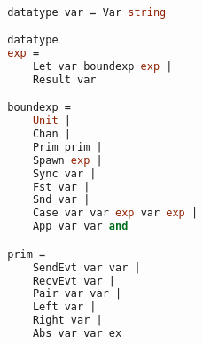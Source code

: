 \documentclass{article}
\begin{document}
    \begin{lstlisting}[language=ML, style=codestyle1]

        datatype var = Var string

        datatype
        exp = 
            Let var boundexp exp |
            Result var

        boundexp =
            Unit |
            Chan |
            Prim prim |
            Spawn exp |
            Sync var |
            Fst var |
            Snd var |
            Case var var exp var exp |
            App var var and

        prim = 
            SendEvt var var |
            RecvEvt var |
            Pair var var |
            Left var |
            Right var |
            Abs var var ex

    \end{lstlisting}

\begin{lstlisting}[language=ML, style=codestyle1]
\end{lstlisting}
\end{document}
